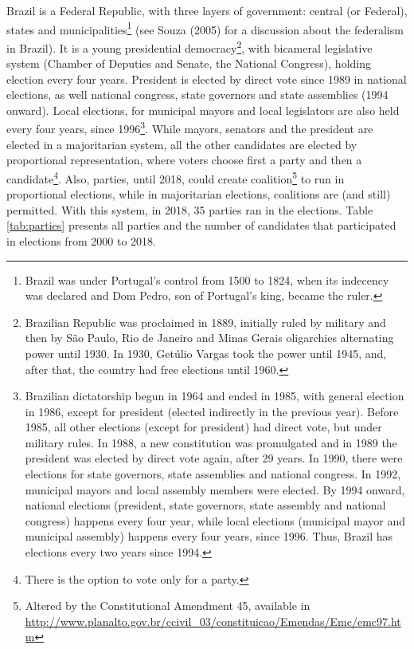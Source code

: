 \documentclass[
  12pt,
]{article}
\begin{document}
Brazil is a Federal Republic, with three layers of government: central
(or Federal), states and municipalities\footnote{Brazil was under
  Portugal's control from 1500 to 1824, when its indecency was declared
  and Dom Pedro, son of Portugal's king, became the ruler.} (see Souza
(2005) for a discussion about the federalism in Brazil). It is a young
presidential democracy\footnote{Brazilian Republic was proclaimed in
  1889, initially ruled by military and then by São Paulo, Rio de
  Janeiro and Minas Gerais oligarchies alternating power until 1930. In
  1930, Getúlio Vargas took the power until 1945, and, after that, the
  country had free elections until 1960.}, with bicameral legislative
system (Chamber of Deputies and Senate, the National Congress), holding
election every four years. President is elected by direct vote since
1989 in national elections, as well national congress, state governors
and state assemblies (1994 onward). Local elections, for municipal
mayors and local legislators are also held every four years, since
1996\footnote{Brazilian dictatorship begun in 1964 and ended in 1985,
  with general election in 1986, except for president (elected
  indirectly in the previous year). Before 1985, all other elections
  (except for president) had direct vote, but under military rules. In
  1988, a new constitution was promulgated and in 1989 the president was
  elected by direct vote again, after 29 years. In 1990, there were
  elections for state governors, state assemblies and national congress.
  In 1992, municipal mayors and local assembly members were elected. By
  1994 onward, national elections (president, state governors, state
  assembly and national congress) happens every four year, while local
  elections (municipal mayor and municipal assembly) happens every four
  years, since 1996. Thus, Brazil has elections every two years since
  1994.}. While mayors, senators and the president are elected in a
majoritarian system, all the other candidates are elected by
proportional representation, where voters choose first a party and then
a candidate\footnote{There is the option to vote only for a party.}.
Also, parties, until 2018, could create coalition\footnote{Altered by
  the Constitutional Amendment 45, available in
  \url{http://www.planalto.gov.br/ccivil_03/constituicao/Emendas/Emc/emc97.htm}}
to run in proportional elections, while in majoritarian elections,
coalitions are (and still) permitted. With this system, in 2018, 35
parties ran in the elections. Table \ref{tab:parties} presents all
parties and the number of candidates that participated in elections from
2000 to 2018.
\end{document}
